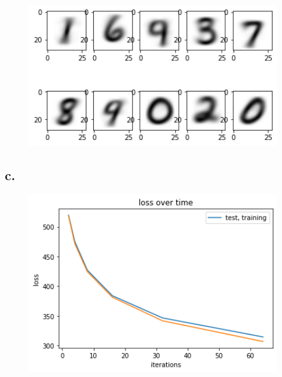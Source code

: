 \documentclass{article}
\newcommand{\1}{\mathbf{1}}
\newcommand{\twonorm}[1]{\|#1\|_2^2}
\begin{document}
{\begin{figure}[!ht]
  \centering
  \includegraphics[width=110mm]{../hw4-code/results/a5_bcenter.png}
\end{figure}

\newpage

\subsection*{c.}


\begin{figure}[!hb]
  \centering
  \includegraphics[width=110mm]{../hw4-code/results/a5_c.png}
\end{figure}

}
\end{document}
